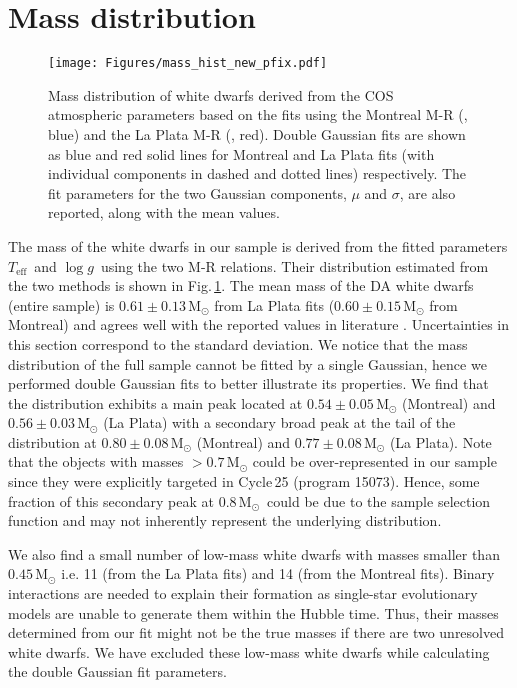 \documentclass[fleqn,usenatbib, useAMS]{mnras}
\newcommand{\Teff}{\mbox{$T_{\mathrm{eff}}$}}
\newcommand{\logg}{\mbox{$\log g$}}
\newcommand{\Msun}{\mbox{$\mathrm{M_\odot}$}}
\begin{document}
\section{Mass distribution}\label{sec:massd}
\begin{figure}
\centering
\texttt{[image: Figures/mass\_hist\_new\_pfix.pdf]}
\caption{Mass distribution of white dwarfs derived from the COS atmospheric parameters based on the fits using the Montreal M-R (\citealt{Bedard2020}, blue) and the La Plata M-R (\citealt{Althaus2013, Camisassa2016, Camisassa2019}, red). Double Gaussian fits are shown as blue and red solid lines for Montreal and La Plata fits (with individual components in dashed and dotted lines) respectively. The fit parameters for the two Gaussian components, $\mu$ and $\sigma$, are also reported, along with the mean values.} 
\label{fig:mass_wd}
\end{figure}

The mass of the white dwarfs in our sample is derived from the fitted parameters \Teff\ and \logg\ using the two M-R relations. Their distribution estimated from the two methods is shown in Fig.\,\ref{fig:mass_wd}. The mean mass of the DA white dwarfs (entire sample) is $0.61\pm0.13\,\Msun$ from La Plata fits ($0.60\pm0.15\,\Msun$ from Montreal) and agrees well with the reported values in literature \citep{Tremblay2019_param, Kilic2020}. Uncertainties in this section correspond to the standard deviation. We notice that the mass distribution of the full sample cannot be fitted by a single Gaussian, hence we performed double Gaussian fits to better illustrate its properties. We find that the distribution exhibits a main peak located at $0.54 \pm 0.05\,\Msun$ (Montreal) and $0.56 \pm 0.03\,\Msun$ (La Plata) with a secondary broad peak at the tail of the distribution at $0.80 \pm 0.08\,\Msun$ (Montreal) and $0.77 \pm 0.08\,\Msun$ (La Plata). Note that the objects with masses $>0.7\,\Msun$ could be over-represented in our sample since they were explicitly targeted in Cycle\,25 (program 15073). Hence, some fraction of this secondary peak at 0.8\,\Msun\ could be due to the sample selection function and may not inherently represent the underlying distribution. 

We also find a small number of low-mass white dwarfs with masses smaller than $0.45\,\Msun$ i.e. 11 (from the La Plata fits) and 14 (from the Montreal fits). Binary interactions are needed to explain their formation as single-star evolutionary models are unable to generate them within the Hubble time. Thus, their masses determined from our fit might not be the true masses if there are two unresolved white dwarfs. We have excluded these low-mass white dwarfs while calculating the double Gaussian fit parameters. 
\end{document}
